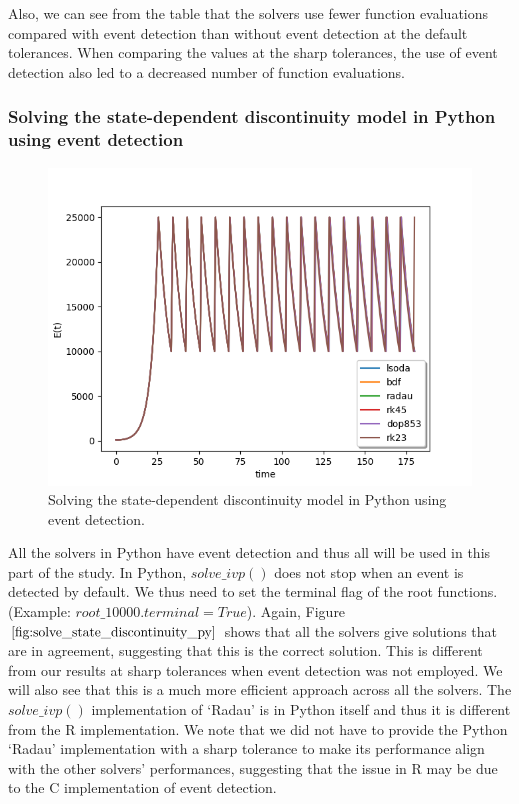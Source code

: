 Also, we can see from the table that the solvers use fewer function evaluations compared with event detection than without event detection at the default tolerances. When comparing the values at the sharp tolerances, the use of event detection also led to a decreased number of function evaluations.


\subsubsection{Solving the state-dependent discontinuity model in Python using event detection}
\begin{figure}[H]
\centering
\includegraphics[width=0.7\linewidth]{./figures/solve_state_discontinuity_py}
\caption{Solving the state-dependent discontinuity model in Python using event detection.}
\label{fig:solve_state_discontinuity_py}
\end{figure}
All the solvers in Python have event detection and thus all will be used in this part of the study. In Python, $solve\_ivp()$ does not stop when an event is detected by default. We thus need to set the terminal flag of the root functions.
(Example: $root\_10000.terminal = True$).
Again, Figure $\ref{fig:solve_state_discontinuity_py}$ shows that all the solvers give solutions that are in agreement, suggesting that this is the correct solution. This is different from our results at sharp tolerances when event detection was not employed. We will also see that this is a much more efficient approach across all the solvers. The $solve\_ivp()$ implementation of `Radau' is in Python itself and thus it is different from the R implementation. We note that we did not have to provide the Python `Radau' implementation with a sharp tolerance to make its performance align with the other solvers' performances, suggesting that the issue in R may be due to the C implementation of event detection.

